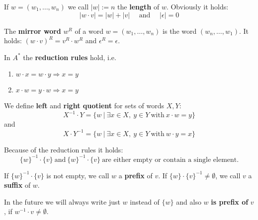 If $w = (w_1, \ldots, w_n)$ we call $|w| := n$ the {\bf length} of
$w$. Obviously it holds: \[|w \cdot v| = |w| + |v| \quad\mbox{ and }\quad
|\epsilon| = 0\]

The {\bf mirror word} $w^R$ of a word $w = (w_1,\ldots,w_n)$ is the word
$(w_n,\ldots,w_1)$. It holds: $(w \cdot v)^R = v^R \cdot w^R$ and $\epsilon^R =
\epsilon$.

In $A^*$ the {\bf reduction rules} hold, i.e.
\begin{enumerate}
  \item $w \cdot x = w \cdot y \Rightarrow x = y$
  \item $x \cdot w = y \cdot w \Rightarrow x = y$
\end{enumerate}

We define {\bf left} and {\bf right quotient} for sets of words $X, Y$:
\[ X^{-1} \cdot Y = \{ w\ |\ \exists x \in X,\ y \in Y\ \mbox{with}\ x \cdot w =
y \} \] and 
\[ X \cdot Y^{-1} = \{ w\ |\ \exists x \in X,\ y \in Y\ \mbox{with}\ w \cdot y =
x \} \]

Because of the reduction rules it holds:
\[ \{w\}^{-1} \cdot \{v\}\ \mbox{and}\ \{w\}^{-1} \cdot \{v\}\ \mbox{are
either empty or contain a single element.} \]

If $\{w\}^{-1} \cdot \{v\}$ is not empty, we call $w$ a {\bf prefix} of $v$. If
$\{w\} \cdot \{v\}^{-1} \not= \emptyset $, we call $v$ a {\bf suffix} of $w$.

In the future we will always write just $w$ instead of $\{w\}$ and also $w$
{\bf is prefix of} $v$, if $w^{-1} \cdot v \not= \emptyset$.

